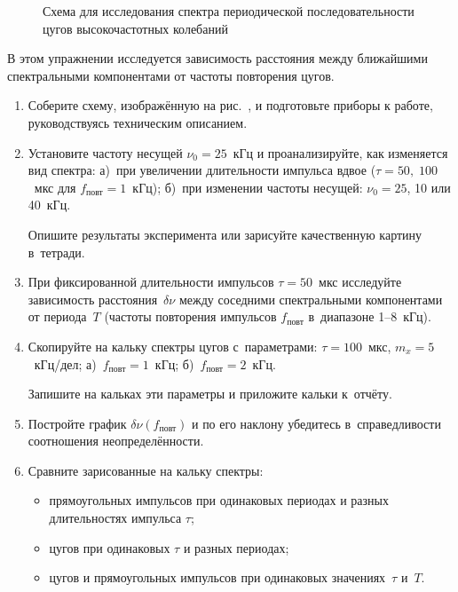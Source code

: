 \begin{figure}[h!]
\centering
{}
\caption{Схема для исследования спектра периодической последовательности
цугов высокочастотных колебаний}
\end{figure}

\begin{lab:task}

В этом упражнении исследуется зависимость расстояния между ближайшими
спектральными компонентами от частоты повторения цугов.

\begin{enumerate}
\item Соберите схему, изображённую на рис.~, и подготовьте приборы к работе, руководствуясь
техническим описанием.

\item Установите частоту несущей $\nu_0=25$~кГц и проанализируйте, как
изменяется вид спектра: а)~при увеличении длительности импульса вдвое
($\tau=50,\;100$~мкс для $f_\text{повт}=1$~кГц); б)~при изменении частоты
несущей: $\nu_0=25$, 10 или 40~кГц.

Опишите результаты эксперимента или зарисуйте качественную картину
в~тетради.

\item При фиксированной длительности импульсов $\tau=50$~мкс исследуйте
зависимость расстояния~$\delta \nu$ между соседними спектральными компонентами
от периода~$T$ (частоты повторения импульсов $f_\text{повт}$ в~диапазоне
1--8~кГц).

\item Скопируйте на кальку спектры цугов с~параметрами: $\tau=100$~мкс,
$m_x=5$~кГц/дел; а)~$f_\text{повт}=1$~кГц; б)~$f_\text{повт}=2$~кГц.

Запишите на кальках эти параметры и приложите кальки к~отчёту.

\item Постройте график $\delta \nu(f_\text{повт})$ и по его наклону
убедитесь в~справедливости соотношения неопределённости.

\item Сравните зарисованные на кальку спектры:
\begin{itemize}
	\item прямоугольных импульсов при одинаковых периодах и разных
длительностях импульса $\tau$;
	\item цугов при одинаковых $\tau$ и разных периодах;
	\item цугов и прямоугольных импульсов при одинаковых значениях~$\tau$
и~$T$.
\end{itemize}
\end{enumerate}

\end{lab:task}

